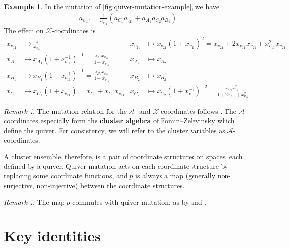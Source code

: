 \documentclass{amsart}
\theoremstyle{plain}
\theoremstyle{definition}
\newtheorem{example}[theorem]{Example}
\theoremstyle{remark}
\newtheorem{remark}[theorem]{Remark}
\newcommand{\defined}[1]{\textbf{#1}}
\begin{document}
  \begin{example}
    In the mutation of \cref{fig:quiver-mutation-example}, we have
    \begin{align*}
      a_{v_{11}'} = \frac{1}{a_{v_{11}}} \left( a_{C_1} a_{v_{21}} + a_{A_1} a_{C_2} a_{B_1} \right)
    \end{align*}
    The effect on $\mathcal{X}$-coordinates is
    \begin{align*}
      x_{v_{11}} &\mapsto \frac{1}{x_{v_{11}}} & x_{v_{21}} &\mapsto x_{v_{21}} (1 + x_{v_{11}})^2 = x_{v_{21}} + 2 x_{v_{11}} x_{v_{21}} + x_{v_{11}}^2 x_{v_{21}}\\
      x_{A_{1}} &\mapsto x_{A_{1}} (1 + x_{v_{11}}^{-1})^{-1} = \frac{x_{A_{1}} x_{v_{11}}}{1 + x_{v_{11}}} & x_{A_{2}} &\mapsto x_{A_{2}} \\
      x_{B_{1}} &\mapsto x_{B_{1}} (1 + x_{v_{11}}^{-1})^{-1} = \frac{x_{B_{1}} x_{v_{11}}}{1 + x_{v_{11}}} & x_{B_{2}} &\mapsto x_{B_{2}} \\
      x_{C_{1}} &\mapsto x_{C_{1}} (1 + x_{v_{11}}) = x_{C_{1}} + x_{C_{1}} x_{v_{11}} & x_{C_{2}} &\mapsto x_{C_{2}} (1 + x_{v_{11}}^{-1})^{-2} = \frac{x_{C_{2}} x_{v_{11}}^{2}}{1 + 2 x_{v_{11}} + x_{v_{11}}^2}
    \end{align*}
  \end{example}

  \begin{remark}
    The mutation relation for the $\mathcal{A}$- and
    $\mathcal{X}$-coordinates follows
    \cite[Equation~2.3]{fominzelevinsky2007}. The
    $\mathcal{A}$-coordinates especially form the \defined{cluster
      algebra} of Fomin--Zelevinsky which define the quiver. For
    consistency, we will refer to the cluster variables as
    $\mathcal{A}$-coordinates.
  \end{remark}

  A cluster ensemble, therefore, is a pair of coordinate structures on
  spaces, each defined by a quiver. Quiver mutation acts on each
  coordinate structure by replacing some coordinate functions, and $p$
  is always a map (generally non-surjective, non-injective) between the
  coordinate structures.

  \begin{remark}
    \label{rem:p-commutes-with-mutation}
    The map $p$ commutes with quiver mutation, as by
    \cite[Section~1.2]{fockgoncharov2003} and
    \cite[Proposition~3.9]{fominzelevinsky2007}.
  \end{remark}

  \section{Key identities}
\end{document}
